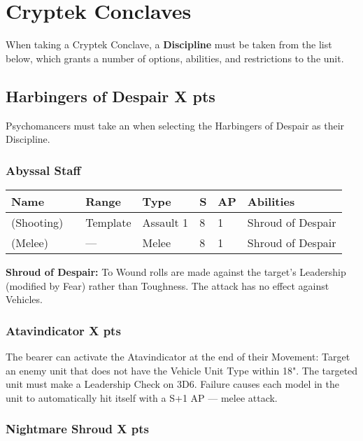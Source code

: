 \section{Cryptek Conclaves}

When taking a Cryptek Conclave, a \textbf{Discipline} must be taken from the list below, which grants a number of options, abilities, and restrictions to the unit.

\subsection[Harbingers of Despair ]{Harbingers of Despair  \hrulefill X pts}

Psychomancers must take an  when selecting the Harbingers of Despair as their Discipline.

\subsubsection{Abyssal Staff}
\label{Abyssal Staff}
\noindent
\begin{tabular}{||m{130pt} m{10pt} m{31pt} m{55pt} m{12pt} m{12pt} m{210pt}||}
	\hline
	Name & & Range & Type & S & AP & Abilities \\
	\hline
	\quickref{Abyssal Staff} (Shooting) & & Template & Assault 1 & 8 & 1 & Shroud of Despair \\
	\quickref{Abyssal Staff} (Melee) & & — & Melee & 8 & 1 & Shroud of Despair \\
	\hline
\end{tabular}

\textbf{Shroud of Despair:} To Wound rolls are made against the target's Leadership (modified by Fear) rather than Toughness. The attack has no effect against Vehicles.

\subsubsection[Atavindicator ]{Atavindicator  \hrulefill X pts}

The bearer can activate the Atavindicator at the end of their Movement: Target an enemy unit that does not have the Vehicle Unit Type within 18". The targeted unit must make a Leadership Check on 3D6. Failure causes each model in the unit to automatically hit itself with a S+1 AP — melee attack.

\subsubsection[Nightmare Shroud ]{Nightmare Shroud  \hrulefill X pts} 

